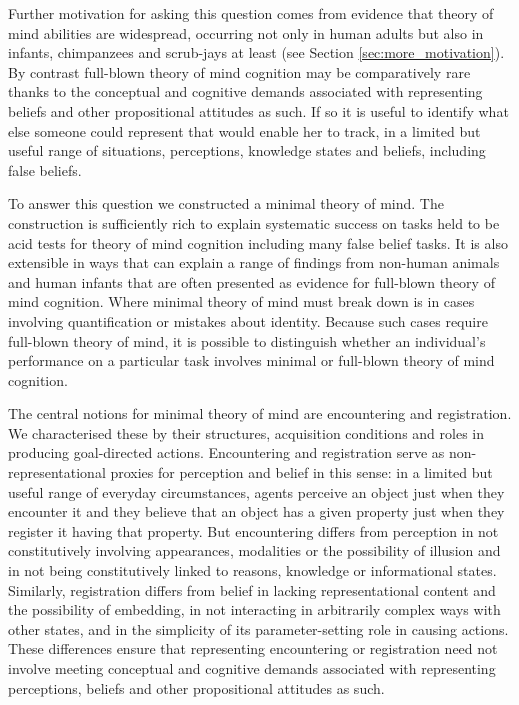 \documentclass[12pt,\papersize]{extarticle}
\begin{document}
Further motivation for asking this question comes from  evidence that theory of mind abilities are widespread, occurring not only in human adults but also in infants, chimpanzees and scrub-jays at least (see Section \ref{sec:more_motivation}).
By contrast full-blown theory of mind cognition may be comparatively rare 
thanks to the conceptual and cognitive demands associated with representing beliefs and other propositional attitudes as such.  
If so it is useful to identify what else someone could represent that would enable her to track, in a limited but useful range of situations, perceptions, knowledge states and beliefs, including false beliefs.  

To answer this question we constructed a minimal theory of mind.  The construction is sufficiently rich to explain systematic success on tasks held to be acid tests for theory of mind cognition including many false belief tasks.  It is also extensible in ways that can explain a range of findings from non-human animals and human infants that are often presented as evidence for full-blown theory of mind cognition.  Where minimal theory of mind must break down is in cases involving quantification or mistakes about identity.  Because such cases require full-blown theory of mind, it is possible to distinguish whether an individual’s performance on a particular task involves minimal or full-blown theory of mind cognition. 

The central notions for minimal theory of mind are encountering and registration.  We characterised these by their structures, acquisition conditions and roles in producing goal-directed actions.  Encountering and registration serve as non-representational proxies for perception and belief in this sense: in a limited but useful range of everyday circumstances, agents perceive an object just when they encounter it and they believe that an object has a given property just when they register it having that property.  But encountering differs from perception in not constitutively involving appearances, modalities or the possibility of illusion and in not being constitutively linked to reasons, knowledge or informational states.  Similarly, registration differs from belief in lacking representational content and the possibility of embedding, in not interacting in arbitrarily complex ways with other states, and in the simplicity of its parameter-setting role in causing actions.  These differences ensure that representing encountering or registration need not involve meeting conceptual and cognitive demands associated with representing perceptions, beliefs and other propositional attitudes as such.
\end{document}
